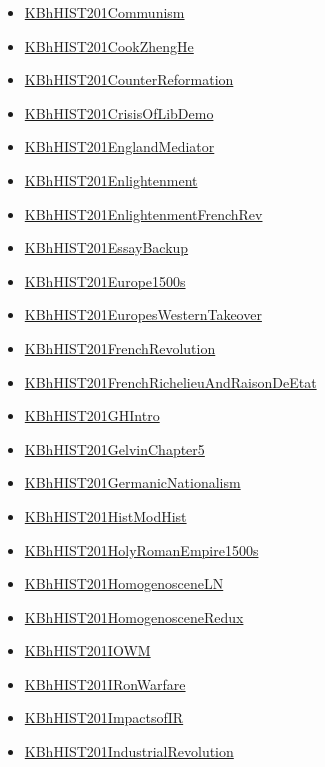 \documentclass[11pt]{article}
\begin{document}
\begin{itemize}
\begin{itemize}
\item \href{hist201/KBhHIST201Communism.org}{KBhHIST201Communism}
\item \href{hist201/KBhHIST201CookZhengHe.org}{KBhHIST201CookZhengHe}
\item \href{hist201/KBhHIST201CounterReformation.org}{KBhHIST201CounterReformation}
\item \href{hist201/KBhHIST201CrisisOfLibDemo.org}{KBhHIST201CrisisOfLibDemo}
\item \href{hist201/KBhHIST201EnglandMediator.org}{KBhHIST201EnglandMediator}
\item \href{hist201/KBhHIST201Enlightenment.org}{KBhHIST201Enlightenment}
\item \href{hist201/KBhHIST201EnlightenmentFrenchRev.org}{KBhHIST201EnlightenmentFrenchRev}
\item \href{hist201/KBhHIST201EssayBackup.org}{KBhHIST201EssayBackup}
\item \href{hist201/KBhHIST201Europe1500s.org}{KBhHIST201Europe1500s}
\item \href{hist201/KBhHIST201EuropesWesternTakeover.org}{KBhHIST201EuropesWesternTakeover}
\item \href{hist201/KBhHIST201FrenchRevolution.org}{KBhHIST201FrenchRevolution}
\item \href{hist201/KBhHIST201FrenchRichelieuAndRaisonDeEtat.org}{KBhHIST201FrenchRichelieuAndRaisonDeEtat}
\item \href{hist201/KBhHIST201GHIntro.org}{KBhHIST201GHIntro}
\item \href{hist201/KBhHIST201GelvinChapter5.org}{KBhHIST201GelvinChapter5}
\item \href{hist201/KBhHIST201GermanicNationalism.org}{KBhHIST201GermanicNationalism}
\item \href{hist201/KBhHIST201HistModHist.org}{KBhHIST201HistModHist}
\item \href{hist201/KBhHIST201HolyRomanEmpire1500s.org}{KBhHIST201HolyRomanEmpire1500s}
\item \href{hist201/KBhHIST201HomogenosceneLN.org}{KBhHIST201HomogenosceneLN}
\item \href{hist201/KBhHIST201HomogenosceneRedux.org}{KBhHIST201HomogenosceneRedux}
\item \href{hist201/KBhHIST201IOWM.org}{KBhHIST201IOWM}
\item \href{hist201/KBhHIST201IRonWarfare.org}{KBhHIST201IRonWarfare}
\item \href{hist201/KBhHIST201ImpactsofIR.org}{KBhHIST201ImpactsofIR}
\item \href{hist201/KBhHIST201IndustrialRevolution.org}{KBhHIST201IndustrialRevolution}

\end{itemize}
\end{itemize}
\end{document}
